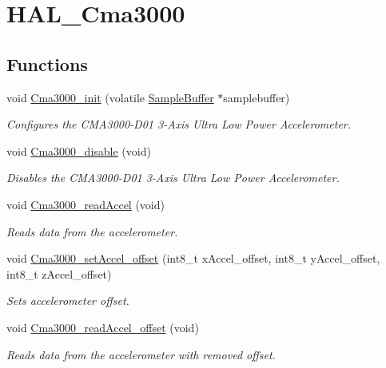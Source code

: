 \hypertarget{group__HAL__Cma3000}{\section{\-H\-A\-L\-\_\-\-Cma3000}
\label{group__HAL__Cma3000}
}
\subsection*{\-Functions}
\begin{DoxyCompactItemize}
\item 
void \hyperlink{group__HAL__Cma3000_gac439f32a065c427ffa5df446dd4c67ca}{\-Cma3000\-\_\-init} (volatile \hyperlink{structSampleBuffer}{\-Sample\-Buffer} $\ast$samplebuffer)
\begin{DoxyCompactList}\small\item\em \-Configures the \-C\-M\-A3000-\/\-D01 3-\/\-Axis \-Ultra \-Low \-Power \-Accelerometer. \end{DoxyCompactList}\item 
void \hyperlink{group__HAL__Cma3000_ga995a83248eda64e38272b13d65adfdd7}{\-Cma3000\-\_\-disable} (void)
\begin{DoxyCompactList}\small\item\em \-Disables the \-C\-M\-A3000-\/\-D01 3-\/\-Axis \-Ultra \-Low \-Power \-Accelerometer. \end{DoxyCompactList}\item 
void \hyperlink{group__HAL__Cma3000_ga026e2b2fc4fa23ab54d57c8e9f43cb16}{\-Cma3000\-\_\-read\-Accel} (void)
\begin{DoxyCompactList}\small\item\em \-Reads data from the accelerometer. \end{DoxyCompactList}\item 
void \hyperlink{group__HAL__Cma3000_ga1cff4c7c212e66af14b2c607dc420e33}{\-Cma3000\-\_\-set\-Accel\-\_\-offset} (int8\-\_\-t x\-Accel\-\_\-offset, int8\-\_\-t y\-Accel\-\_\-offset, int8\-\_\-t z\-Accel\-\_\-offset)
\begin{DoxyCompactList}\small\item\em \-Sets accelerometer offset. \end{DoxyCompactList}\item 
void \hyperlink{group__HAL__Cma3000_gae35d5bf91afe0aac0557c10c5446680c}{\-Cma3000\-\_\-read\-Accel\-\_\-offset} (void)
\begin{DoxyCompactList}\small\item\em \-Reads data from the accelerometer with removed offset. \end{DoxyCompactList}\item 

\end{DoxyCompactItemize}
